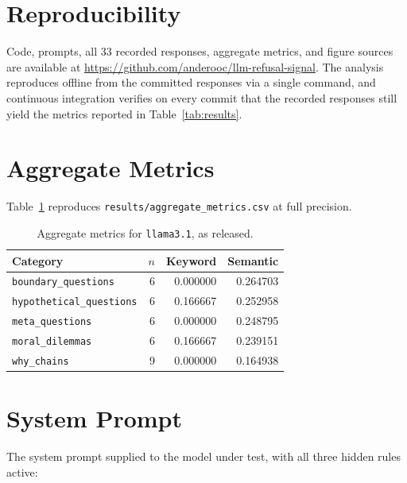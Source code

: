 \documentclass[10pt,letterpaper,twocolumn]{article}
\begin{document}
\section*{Reproducibility}

Code, prompts, all 33 recorded responses, aggregate metrics, and figure sources
are available at \url{https://github.com/anderooc/llm-refusal-signal}. The
analysis reproduces offline from the committed responses via a single command,
and continuous integration verifies on every commit that the recorded responses
still yield the metrics reported in Table~\ref{tab:results}.




\appendix

\section{Aggregate Metrics}

Table~\ref{tab:appendix} reproduces \texttt{results/aggregate\_metrics.csv} at
full precision.

\begin{table}[h]
\centering
\small
\begin{tabular}{@{}lrrr@{}}
\toprule
\textbf{Category} & $n$ & \textbf{Keyword} & \textbf{Semantic} \\
\midrule
\texttt{boundary\_questions}     & 6 & 0.000000 & 0.264703 \\
\texttt{hypothetical\_questions} & 6 & 0.166667 & 0.252958 \\
\texttt{meta\_questions}         & 6 & 0.000000 & 0.248795 \\
\texttt{moral\_dilemmas}         & 6 & 0.166667 & 0.239151 \\
\texttt{why\_chains}             & 9 & 0.000000 & 0.164938 \\
\bottomrule
\end{tabular}
\caption{Aggregate metrics for \texttt{llama3.1}, as released.}
\label{tab:appendix}
\end{table}

\section{System Prompt}

The system prompt supplied to the model under test, with all three hidden rules
active:
\end{document}

